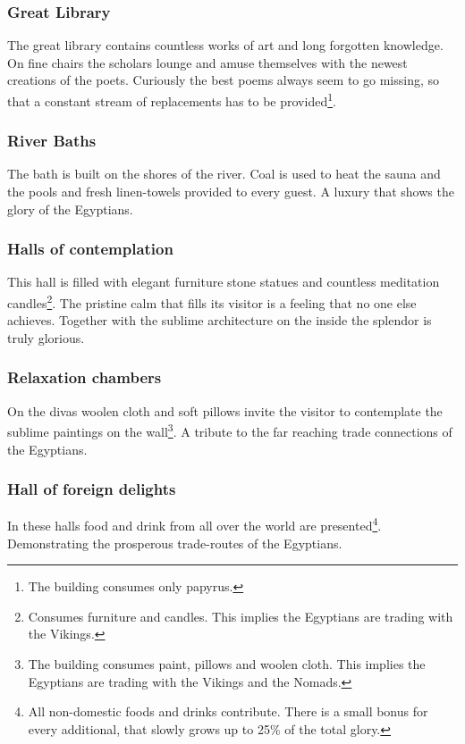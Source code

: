 \documentclass[a4paper]{book}
\begin{document}
\subsubsection{Great Library}
The great library contains countless works of art and long forgotten knowledge.
On fine chairs the scholars lounge and amuse themselves with the newest
creations of the poets. Curiously the best poems always seem to go missing, so
that a constant stream of replacements has to be provided\footnote{ The
	building consumes only papyrus. }.

\subsubsection{River Baths}
The bath is built on the shores of the river. Coal is used to heat the sauna
and the pools and fresh linen-towels provided to every guest. A luxury that
shows the glory of the \gls{Egyptians}.

\subsubsection{Halls of contemplation}
This hall is filled with elegant furniture stone statues and countless
meditation candles\footnote{ Consumes furniture and candles. This implies the
	\gls{Egyptians} are trading with the \gls{Vikings}. }. The pristine calm that
fills its visitor is a feeling that no one else achieves. Together with the
sublime architecture on the inside the splendor is truly glorious.

\subsubsection{Relaxation chambers}
On the divas woolen cloth and soft pillows invite the visitor to contemplate
the sublime paintings on the wall\footnote{ The building consumes paint,
	pillows and woolen cloth. This implies the \gls{Egyptians} are trading with the
	\gls{Vikings} and the \gls{Nomads}. }. A tribute to the far reaching trade
connections of the \gls{Egyptians}.

\subsubsection{Hall of foreign delights}
In these halls food and drink from all over the world are presented\footnote{
	All non-domestic foods and drinks contribute. There is a small bonus for every
	additional, that slowly grows up to 25\% of the total glory. }. Demonstrating
the prosperous trade-routes of the \gls{Egyptians}.
\end{document}
